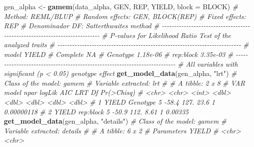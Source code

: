 \documentclass[
]{book}
\newenvironment{Shaded}{\begin{snugshade}}{\end{snugshade}}
\newcommand{\CommentTok}[1]{\textcolor[rgb]{0.56,0.35,0.01}{\textit{#1}}}
\newcommand{\DataTypeTok}[1]{\textcolor[rgb]{0.13,0.29,0.53}{#1}}
\newcommand{\KeywordTok}[1]{\textcolor[rgb]{0.13,0.29,0.53}{\textbf{#1}}}
\newcommand{\NormalTok}[1]{#1}
\newcommand{\StringTok}[1]{\textcolor[rgb]{0.31,0.60,0.02}{#1}}
\numberwithin{equation}{section}
\begin{document}
\begin{Shaded}
\begin{Highlighting}[]
\NormalTok{gen\_alpha \textless{}{-}}\StringTok{ }\KeywordTok{gamem}\NormalTok{(data\_alpha, GEN, REP, YIELD, }\DataTypeTok{block =}\NormalTok{ BLOCK)}
\CommentTok{\# Method: REML/BLUP}
\CommentTok{\# Random effects: GEN, BLOCK(REP)}
\CommentTok{\# Fixed effects: REP}
\CommentTok{\# Denominador DF: Satterthwaite\textquotesingle{}s method}
\CommentTok{\# {-}{-}{-}{-}{-}{-}{-}{-}{-}{-}{-}{-}{-}{-}{-}{-}{-}{-}{-}{-}{-}{-}{-}{-}{-}{-}{-}{-}{-}{-}{-}{-}{-}{-}{-}{-}{-}{-}{-}{-}{-}{-}{-}{-}{-}{-}{-}{-}{-}{-}{-}{-}{-}{-}{-}{-}{-}{-}{-}{-}{-}{-}{-}{-}{-}{-}{-}{-}{-}{-}{-}{-}{-}{-}{-}}
\CommentTok{\# P{-}values for Likelihood Ratio Test of the analyzed traits}
\CommentTok{\# {-}{-}{-}{-}{-}{-}{-}{-}{-}{-}{-}{-}{-}{-}{-}{-}{-}{-}{-}{-}{-}{-}{-}{-}{-}{-}{-}{-}{-}{-}{-}{-}{-}{-}{-}{-}{-}{-}{-}{-}{-}{-}{-}{-}{-}{-}{-}{-}{-}{-}{-}{-}{-}{-}{-}{-}{-}{-}{-}{-}{-}{-}{-}{-}{-}{-}{-}{-}{-}{-}{-}{-}{-}{-}{-}}
\CommentTok{\#      model    YIELD}
\CommentTok{\#   Complete       NA}
\CommentTok{\#   Genotype 1.18e{-}06}
\CommentTok{\#  rep:block 3.35e{-}03}
\CommentTok{\# {-}{-}{-}{-}{-}{-}{-}{-}{-}{-}{-}{-}{-}{-}{-}{-}{-}{-}{-}{-}{-}{-}{-}{-}{-}{-}{-}{-}{-}{-}{-}{-}{-}{-}{-}{-}{-}{-}{-}{-}{-}{-}{-}{-}{-}{-}{-}{-}{-}{-}{-}{-}{-}{-}{-}{-}{-}{-}{-}{-}{-}{-}{-}{-}{-}{-}{-}{-}{-}{-}{-}{-}{-}{-}{-}}
\CommentTok{\# All variables with significant (p \textless{} 0.05) genotype effect}
\KeywordTok{get\_model\_data}\NormalTok{(gen\_alpha, }\StringTok{"lrt"}\NormalTok{)}
\CommentTok{\# Class of the model: gamem}
\CommentTok{\# Variable extracted: lrt}
\CommentTok{\# \# A tibble: 2 x 8}
\CommentTok{\#   VAR   model      npar logLik   AIC   LRT    Df \textasciigrave{}Pr(\textgreater{}Chisq)\textasciigrave{}}
\CommentTok{\#   \textless{}chr\textgreater{} \textless{}chr\textgreater{}     \textless{}int\textgreater{}  \textless{}dbl\textgreater{} \textless{}dbl\textgreater{} \textless{}dbl\textgreater{} \textless{}dbl\textgreater{}        \textless{}dbl\textgreater{}}
\CommentTok{\# 1 YIELD Genotype      5  {-}58.4  127. 23.6      1   0.00000118}
\CommentTok{\# 2 YIELD rep:block     5  {-}50.9  112.  8.61     1   0.00335}
\KeywordTok{get\_model\_data}\NormalTok{(gen\_alpha, }\StringTok{"details"}\NormalTok{)}
\CommentTok{\# Class of the model: gamem}
\CommentTok{\# Variable extracted: details}
\CommentTok{\# \# A tibble: 6 x 2}
\CommentTok{\#   Parameters YIELD                   }
\CommentTok{\#   \textless{}chr\textgreater{}      \textless{}chr\textgreater{}                   }

\end{Highlighting}
\end{Shaded}
\end{document}
